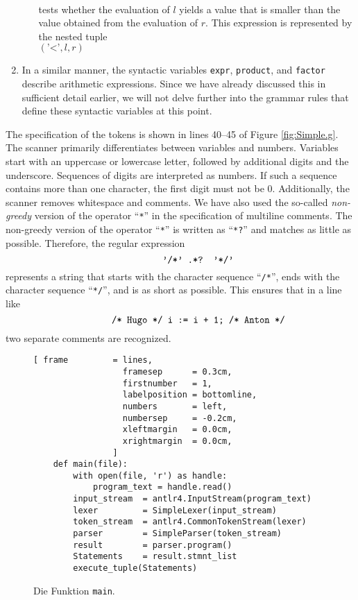 \begin{enumerate}
\begin{enumerate}
            \\[0.2cm]
            tests whether the evaluation of $l$ yields a value that is smaller than the
            value obtained from the evaluation of $r$. 
            This expression is represented by the nested tuple
            \\[0.2cm]
            \hspace*{1.3cm}
            $(\texttt{'<'}, l, r)$
      \end{enumerate}
\item In a similar manner, the syntactic variables \texttt{expr}, \texttt{product}, and \texttt{factor}
      describe arithmetic expressions.
      Since we have already discussed this in sufficient detail earlier, we will not delve further into
      the grammar rules that define these syntactic variables at this point.
\end{enumerate}
The specification of the tokens is shown in lines 40--45 of Figure \ref{fig:Simple.g}.
The scanner primarily differentiates between variables and numbers.
Variables start with an uppercase or lowercase letter, followed by additional digits and
the underscore. Sequences of digits are interpreted as numbers. If such a
sequence contains more than one character, the first digit must not be 0. Additionally, the
scanner removes whitespace and comments. We have also used the so-called \emph{non-greedy} version of the
operator ``\texttt{*}'' in the specification of multiline comments. The non-greedy version of the
operator ``\texttt{*}'' is written as ``\texttt{*?}'' and matches as little as possible. Therefore, the regular expression
\[
\hspace*{1.3cm}
\texttt{'/*' .*? '*/'}
\]
represents a string that starts with the character sequence ``\texttt{/*}'', ends with the character sequence ``\texttt{*/}'',
and is as short as possible. This ensures that in a line like
\[
\hspace*{1.3cm}
\texttt{/* Hugo */ i := i + 1; /* Anton */}
\]
two separate comments are recognized.


\begin{figure}[!ht]
\centering
\begin{Verbatim}[ frame         = lines, 
                  framesep      = 0.3cm, 
                  firstnumber   = 1,
                  labelposition = bottomline,
                  numbers       = left,
                  numbersep     = -0.2cm,
                  xleftmargin   = 0.0cm,
                  xrightmargin  = 0.0cm,
                ]
    def main(file):
        with open(file, 'r') as handle:
            program_text = handle.read()
        input_stream  = antlr4.InputStream(program_text)
        lexer         = SimpleLexer(input_stream)
        token_stream  = antlr4.CommonTokenStream(lexer)
        parser        = SimpleParser(token_stream)
        result        = parser.program()
        Statements    = result.stmnt_list
        execute_tuple(Statements)
\end{Verbatim}
\vspace*{-0.3cm}
\caption{Die Funktion \texttt{main}.}
\label{fig:Interpreter.ipynb:main}
\end{figure}

